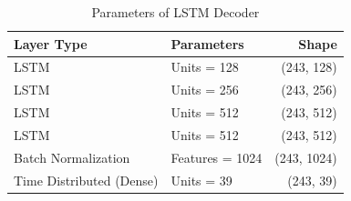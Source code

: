 \begin{footnotesize}
	\begin{table}
		\centering
		\caption{Parameters of LSTM Decoder}
		\label{tab:lstm_decoder}
		\begin{tabularx}{0.5\textwidth}{XXr}
			\toprule
			\textbf{Layer Type} & \textbf{Parameters}                                                                   & \textbf{Shape}     \\ 
			\midrule
			LSTM               	& Units = 128	                                                                        & (243, 128)         \\[0.25cm] 
			LSTM               	& Units = 256	                                                                        & (243, 256)         \\[0.25cm] 
			LSTM               	& Units = 512	                                                                        & (243, 512)         \\[0.25cm]
			LSTM               	& Units = 512	                                                                        & (243, 512)         \\[0.25cm] 
			Batch Normalization & Features = 1024	                                                                    & (243, 1024)        \\[0.25cm]  
			Time Distributed (Dense)  	& Units = 39				                                                    & (243, 39)          \\
			\bottomrule
		\end{tabularx}
	\end{table}
\end{footnotesize}